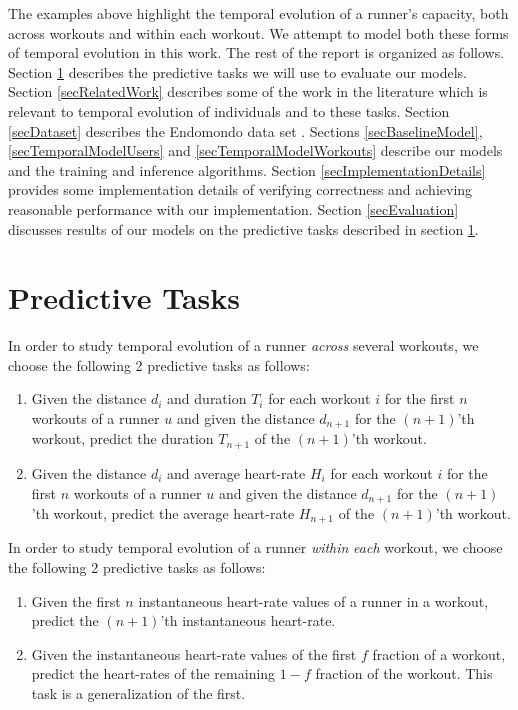 \documentclass{acm_proc_article-sp}
\begin{document}
The examples above highlight the temporal evolution of a runner's capacity, both across workouts and within each workout. We attempt to model both these forms of temporal evolution in this work. The rest of the report is organized as follows. Section \ref{secPredictiveTasks} describes the predictive tasks we will use to evaluate our models. Section \ref{secRelatedWork} describes some of the work in the literature which is relevant to temporal evolution of individuals and to these tasks. Section \ref{secDataset} describes the Endomondo data set \cite{endomondo}. Sections \ref{secBaselineModel}, \ref{secTemporalModelUsers} and \ref{secTemporalModelWorkouts} describe our models and the training and inference algorithms. Section \ref{secImplementationDetails} provides some implementation details of verifying correctness and achieving reasonable performance with our implementation. Section \ref{secEvaluation} discusses results of our models on the predictive tasks described in section \ref{secPredictiveTasks}. 

\section{Predictive Tasks}
\label{secPredictiveTasks}
In order to study temporal evolution of a runner \emph{across} several workouts, we choose the following 2 predictive tasks as follows:
\begin{enumerate}
\item Given the distance $d_i$ and duration $T_i$ for each workout $i$ for the first $n$ workouts of a runner $u$ and given the distance $d_{n+1}$ for the $(n+1)$'th workout, predict the duration $T_{n+1}$ of the $(n+1)$'th workout.
\item Given the distance $d_i$ and average heart-rate $H_i$ for each workout $i$ for the first $n$ workouts of a runner $u$ and given the distance $d_{n+1}$ for the $(n+1)$'th workout, predict the average heart-rate $H_{n+1}$ of the $(n+1)$'th workout.
\end{enumerate}

In order to study temporal evolution of a runner \emph{within} \emph{each} workout, we choose the following 2 predictive tasks as follows:

\begin{enumerate}
\item Given the first $n$ instantaneous heart-rate values of a runner in a workout, predict the $(n+1)$'th instantaneous heart-rate.
\item Given the instantaneous heart-rate values of the first $f$ fraction of a workout, predict the heart-rates of the remaining $1-f$ fraction of the workout. This task is a generalization of the first.
\end{enumerate}
\end{document}
